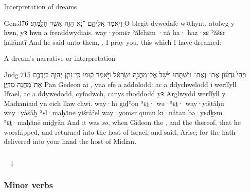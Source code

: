 \begin{frame}{\ex Interpretation of dreams}
	\begin{example}{Gen.}{37}{6}{}{}
		\quoling
		{וַיֹּ֖אמֶר אֲלֵיהֶ֑ם ־נָ֕א  הַזֶּ֖ה אֲשֶׁ֥ר חָלָֽמְתִּי׃}
		{O blegit dywedaſe wꝛthynt,  atolwg y  hwn, yꝛ hwn a frenddwydiais.}
		{way·yōmɛr ʾălēhɛm ·nå ha· haz·zɛ ʾăšɛr ḥålåmtī}
		{And he said unto them, , I pray you, this  which I have dreamed:}
	\end{example}
\end{frame}



\begin{frame}{\ex A dream’s narrative or interpretation}
	\begin{example}{Judg.}{7}{15}{}{}
		\quoling
		{וַיְהִי֩  גִּדְע֜וֹן אֶת־ וְאֶת־ וַיִּשְׁתָּ֑חוּ וַיָּ֙שָׁב֙ אֶל־מַחֲנֵ֣ה יִשְׂרָאֵ֔ל וַיֹּ֣אמֶר ק֔וּמוּ כִּֽי־נָתַ֧ן יְהוָ֛ה בְּיֶדְכֶ֖ם אֶת־מַחֲנֵ֥ה מִדְיָֽן׃}
		{Pan  Gedeon  ai , yna efe a addolodd: ac a ddychwelodd i werſſyll Iſrael, ac a ddywedodd, cyfodwch, canys rhoddodd yꝛ Arglwydd werſſyll y Madianiaid yn eich llaw chwi.}
		{way·hī  giḏʿōn ʾɛṯ· wə·ʾɛṯ· way·yištåḥū way·yåšåḇ ʾɛl·maḥănē yiśråʾēl way·yōmɛr qūmū kī·nåṯan {\YHWH} bə·yɛḏḵɛm ʾɛṯ·maḥănē miḏyån}
		{And it was \textit{so}, when Gideon  the , and the  thereof, that he worshipped, and returned into the host of Israel, and said, Arise; for the {\LORD} hath delivered into your hand the host of Midian.}
	\end{example}
\end{frame}



\subsubsection{}

\subsubsection{~+ }

\subsubsection{Minor verbs}

